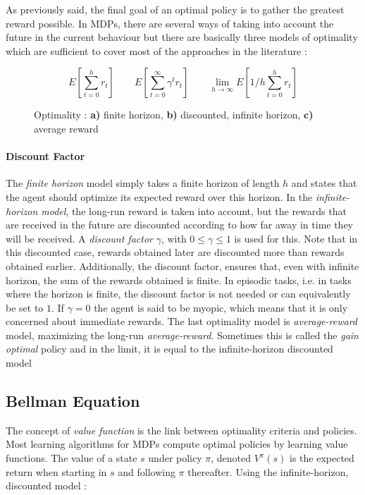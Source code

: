 As previously said, the final goal of an optimal policy is to gather the greatest reward possible. In MDPs, there are several ways of taking into account the future in the current behaviour but there are basically three models of optimality which are sufficient to cover most of the approaches in the literature :

\begin{figure}[h!]
\begin{equation*}
E[\sum_{t = 0}^h r_t]
\qquad
E[\sum_{t = 0}^\infty \gamma^t r_t]
\qquad
\lim\limits_{h \rightarrow \infty} E[1/h \sum_{t = 0}^h r_t]
\end{equation*}
\caption{Optimality : \textbf{a)} finite horizon, \textbf{b)} discounted, infinite horizon, \textbf{c)} average reward}
\end{figure}

\paragraph{Discount Factor}The \textit{finite horizon} model simply takes a finite horizon of length $h$ and states that the agent should optimize its expected reward over this horizon. In the \textit{infinite-horizon model}, the long-run reward is taken into account, but the rewards that are received in the future are discounted according to how far away in time they will be received.
A \textit{discount factor} $\gamma$, with $0 \leq \gamma \leq 1$ is used for this. Note that in this discounted case, rewards obtained later are discounted more than rewards obtained earlier. Additionally, the discount factor, ensures that, even with infinite horizon, the sum of the rewards obtained is finite. In episodic tasks, i.e. in tasks where the horizon is finite, the discount factor is not
needed or can equivalently be set to $1$. If $\gamma = 0$ the agent is said to be myopic, which means that it is only concerned about immediate rewards.
The last optimality model is \textit{average-reward} model, maximizing the long-run \textit{average-reward}. Sometimes this is called the \textit{gain optimal} policy and in the limit, it is equal to the infinite-horizon discounted model~\cite{wiering2012reinforcement}

\subsection {Bellman Equation} The concept of \textit{value function} is the link between optimality criteria and policies. Most learning algorithms for MDPs compute optimal policies by learning value functions. The value of a state $s$ under policy $\pi$, denoted $V^\pi (s)$ is the expected return when starting in $s$ and following $\pi$ thereafter. Using the infinite-horizon, discounted model :

